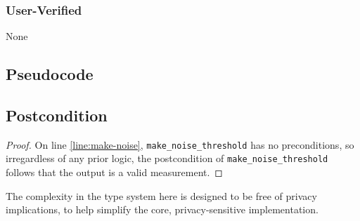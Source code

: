 \documentclass{article}
\begin{document}
\subsubsection*{User-Verified}
None

\subsection*{Pseudocode}


\subsection*{Postcondition}
\begin{theorem}
\end{theorem}

\begin{proof}
    On line \ref{line:make-noise}, \texttt{make\_noise\_threshold} has no preconditions, 
    so irregardless of any prior logic,
    the postcondition of \texttt{make\_noise\_threshold} follows that the output is a valid measurement.
\end{proof}

The complexity in the type system here is designed to be free of privacy implications,
to help simplify the core, privacy-sensitive implementation.
\end{document}

